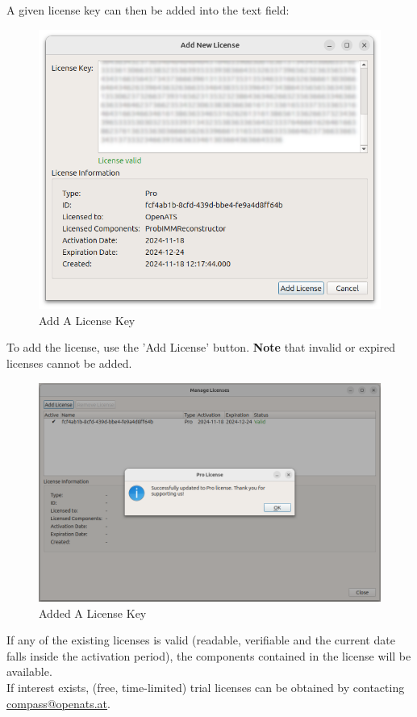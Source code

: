 A given license key can then be added into the text field:

\begin{figure}[H]
    \includegraphics[width=14cm]{figures/configure_license_add2.png}
  \caption{Add A License Key}
\end{figure}

To add the license, use the 'Add License' button. 
\textbf{Note} that invalid or expired licenses cannot be added.

\begin{figure}[H]
    \includegraphics[width=14cm]{figures/configure_license_add3.png}
  \caption{Added A License Key}
\end{figure}

If any of the existing licenses is valid (readable, verifiable and the current date falls inside the activation period), the components contained in the license will be available. \\

If interest exists, (free, time-limited) trial licenses can be obtained by contacting \href{mailto:compass@openats.at}{compass@openats.at}.
